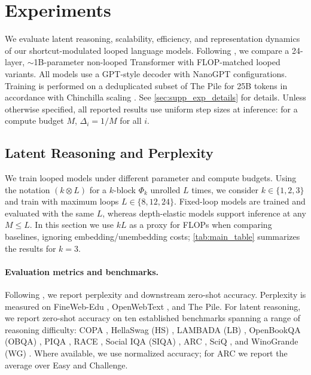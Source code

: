 \section{Experiments}
\label{sec:experiments}

We evaluate latent reasoning, scalability, efficiency, and representation dynamics of our shortcut-modulated looped language models. Following \cite{tay2022ul2, saunshi2025reasoning}, we compare a 24-layer, $\sim$1B-parameter non-looped Transformer with FLOP-matched looped variants. All models use a GPT-style decoder \cite{radford2019language} with NanoGPT configurations. Training is performed on a deduplicated subset of The Pile \cite{gao2020pile} for 25B tokens in accordance with Chinchilla scaling \cite{hoffmann2022training}. See \autoref{sec:supp_exp_details} for details. Unless otherwise specified, all reported results use uniform step sizes at inference: for a compute budget $M$, $\Delta_i = 1/M$ for all $i$.

\subsection{Latent Reasoning and Perplexity}
We train looped models under different parameter and compute budgets. Using the notation $(k \otimes L)$ for a $k$-block $\Phi_k$ unrolled $L$ times, we consider $k \in \{1,2,3\}$ and train with maximum loops $L \in \{8,12,24\}$. Fixed-loop models are trained and evaluated with the same $L$, whereas depth-elastic models support inference at any $M \le L$. In this section we use $kL$ as a proxy for FLOPs when comparing baselines, ignoring embedding/unembedding costs; %
\autoref{tab:main_table} summarizes the results for $k=3$.



\paragraph{Evaluation metrics and benchmarks.}
Following \cite{saunshi2025reasoning, geiping2025scaling, bae2025mixture}, we report perplexity and downstream zero-shot accuracy. Perplexity is measured on FineWeb-Edu \cite{penedo2024fineweb}, OpenWebText \cite{Gokaslan2019OpenWeb}, and The Pile. For latent reasoning, we report zero-shot accuracy on ten established benchmarks spanning a range of reasoning difficulty: COPA \cite{roemmele2011choice}, HellaSwag (HS) \cite{zellers2019hellaswag}, LAMBADA (LB) \cite{paperno2016lambada}, OpenBookQA (OBQA) \cite{mihaylov2018can}, PIQA \cite{bisk2020piqa}, RACE \cite{lai2017race}, Social IQA (SIQA) \cite{sap2019socialiqa}, ARC \cite{clark2018think}, SciQ \cite{welbl2017crowdsourcing}, and WinoGrande (WG) \cite{sakaguchi2021winogrande}. Where available, we use normalized accuracy; for ARC we report the average over Easy and Challenge. 

